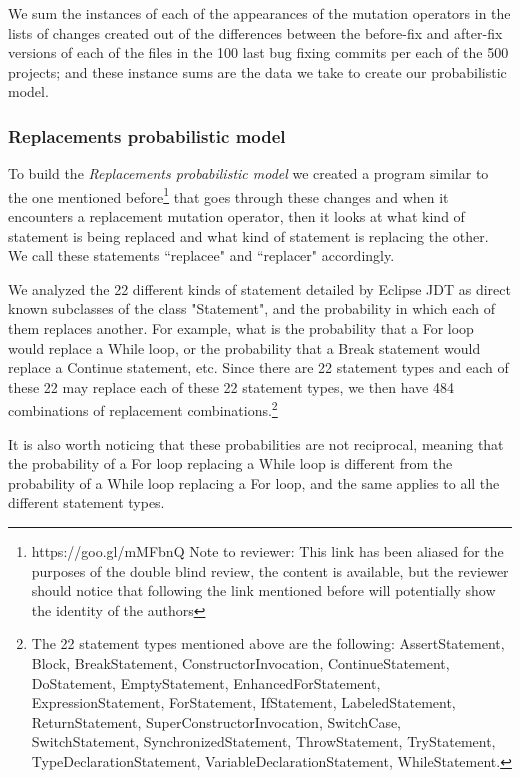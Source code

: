 \documentclass[conference]{IEEEtran}
\begin{document}
We sum the instances of each of the appearances of the mutation operators in the 
lists of changes created out of the differences between the before-fix and 
after-fix versions of each of the files in the 100 last bug fixing commits per 
each of the 500 projects; and these instance sums are the data we take to create 
our probabilistic model.

\subsubsection{Replacements probabilistic model}
To build the \textit{Replacements probabilistic model} we created a 
program similar to the one mentioned before\footnote{https://goo.gl/mMFbnQ
Note to reviewer: This link has been aliased for the purposes of the double 
blind review, the content is available, but the reviewer should notice that 
following the link mentioned before will potentially show the identity of the authors} that 
goes through these 
changes and when it encounters a  replacement mutation operator, then it looks 
at what kind of statement is being 
replaced and what kind of statement is replacing the other. We call these 
statements ``replacee" and ``replacer" accordingly.


We analyzed the 22 different kinds of statement detailed by Eclipse JDT as direct known subclasses of the class "Statement", and the probability in which each of 
them replaces another. For example, what is the probability that a For loop 
would replace a While loop, or the probability that a Break statement would 
replace a Continue statement, etc. Since there are 22 statement types and each of these 22 may 
replace each of these 22 statement types, we then have 484 combinations of 
replacement combinations.\footnote{The 22 statement types mentioned above are the following: AssertStatement, Block, BreakStatement, ConstructorInvocation, ContinueStatement, DoStatement, EmptyStatement, EnhancedForStatement, ExpressionStatement, ForStatement, IfStatement, LabeledStatement, ReturnStatement, SuperConstructorInvocation, SwitchCase, SwitchStatement, SynchronizedStatement, ThrowStatement, TryStatement, TypeDeclarationStatement, VariableDeclarationStatement, WhileStatement.\label{stmtNames}}

It is also worth noticing that these probabilities are not reciprocal, meaning 
that the probability of a For loop replacing a While loop is different from the 
probability of a While loop replacing a For loop, and the same applies to all 
the different statement types.
\end{document}
